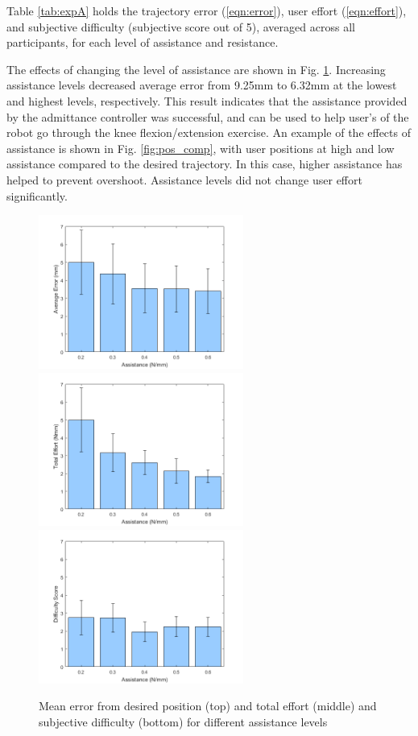 \documentclass[12pt]{report}
\begin{document}
	Table \ref{tab:expA} holds the trajectory error (\ref{eqn:error}), user effort (\ref{eqn:effort}), and subjective difficulty (subjective score out of 5), averaged across all participants,	for each level of assistance and resistance. 
	
	The effects of changing the level of assistance are shown in Fig. \ref{fig:assist}. Increasing assistance levels decreased average error from 9.25mm to 6.32mm at the lowest and highest levels, respectively. This result indicates that the assistance provided by the admittance controller was successful, and can be used to help user's of the robot go through the knee flexion/extension exercise. An example of the effects of assistance is shown in Fig. \ref{fig:pos_comp}, with user positions at high and low assistance compared to the desired trajectory. In this case, higher assistance has helped to prevent overshoot. Assistance levels did not change user effort significantly.
	
	\begin{figure}[p]
	\centering
	\includegraphics[width=0.6\textwidth]{err_assist}
	\includegraphics[width=0.6\textwidth]{eff_assist}
	\includegraphics[width=0.6\textwidth]{diff_assist}
	\caption{Mean error from desired position (top) and total effort (middle) and subjective difficulty (bottom) for different assistance levels}
	\label{fig:assist}
\end{figure}	
\end{document}
